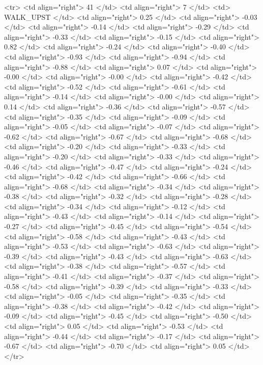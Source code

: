   <tr> <td align="right"> 41 </td> <td align="right">   7 </td> <td> WALK_UPST </td> <td align="right"> 0.25 </td> <td align="right"> -0.03 </td> <td align="right"> -0.14 </td> <td align="right"> -0.29 </td> <td align="right"> -0.33 </td> <td align="right"> -0.15 </td> <td align="right"> 0.82 </td> <td align="right"> -0.24 </td> <td align="right"> -0.40 </td> <td align="right"> -0.93 </td> <td align="right"> -0.94 </td> <td align="right"> -0.88 </td> <td align="right"> 0.07 </td> <td align="right"> -0.00 </td> <td align="right"> -0.00 </td> <td align="right"> -0.42 </td> <td align="right"> -0.52 </td> <td align="right"> -0.61 </td> <td align="right"> -0.14 </td> <td align="right"> -0.00 </td> <td align="right"> 0.14 </td> <td align="right"> -0.36 </td> <td align="right"> -0.57 </td> <td align="right"> -0.35 </td> <td align="right"> -0.09 </td> <td align="right"> -0.05 </td> <td align="right"> -0.07 </td> <td align="right"> -0.62 </td> <td align="right"> -0.67 </td> <td align="right"> -0.68 </td> <td align="right"> -0.20 </td> <td align="right"> -0.33 </td> <td align="right"> -0.20 </td> <td align="right"> -0.33 </td> <td align="right"> -0.46 </td> <td align="right"> -0.47 </td> <td align="right"> -0.24 </td> <td align="right"> -0.42 </td> <td align="right"> -0.66 </td> <td align="right"> -0.68 </td> <td align="right"> -0.34 </td> <td align="right"> -0.38 </td> <td align="right"> -0.32 </td> <td align="right"> -0.28 </td> <td align="right"> -0.34 </td> <td align="right"> -0.12 </td> <td align="right"> -0.43 </td> <td align="right"> -0.14 </td> <td align="right"> -0.27 </td> <td align="right"> -0.45 </td> <td align="right"> -0.54 </td> <td align="right"> -0.58 </td> <td align="right"> -0.43 </td> <td align="right"> -0.53 </td> <td align="right"> -0.63 </td> <td align="right"> -0.39 </td> <td align="right"> -0.43 </td> <td align="right"> -0.63 </td> <td align="right"> -0.38 </td> <td align="right"> -0.57 </td> <td align="right"> -0.41 </td> <td align="right"> -0.37 </td> <td align="right"> -0.58 </td> <td align="right"> -0.39 </td> <td align="right"> -0.33 </td> <td align="right"> -0.05 </td> <td align="right"> -0.35 </td> <td align="right"> -0.38 </td> <td align="right"> -0.42 </td> <td align="right"> -0.09 </td> <td align="right"> -0.45 </td> <td align="right"> -0.50 </td> <td align="right"> 0.05 </td> <td align="right"> -0.53 </td> <td align="right"> -0.44 </td> <td align="right"> -0.17 </td> <td align="right"> -0.67 </td> <td align="right"> -0.70 </td> <td align="right"> 0.05 </td> </tr>
